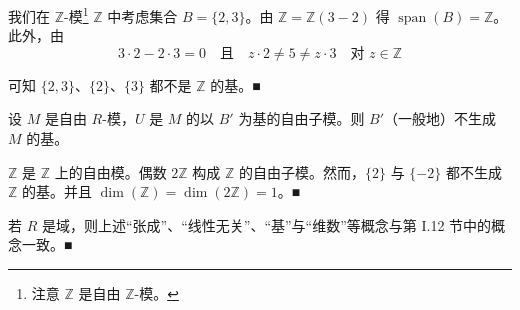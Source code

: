\begin{remark}
\begin{items}
\proofhead
我们在 $ \mathbb{Z} $-模\footnote{注意 $ \mathbb{Z} $ 是自由 $ \mathbb{Z} $-模。} $ \mathbb{Z} $ 中考虑集合 $ B = \{2,3\} $。由 $ \mathbb{Z} = \mathbb{Z}(3-2) $ 得 $ \operatorname{span}(B) = \mathbb{Z} $。此外，由
\[
3\cdot 2 - 2\cdot 3 = 0 \quad \text{且} \quad z\cdot 2 \ne 5 \ne z\cdot 3 \quad \text{对 } z \in \mathbb{Z}
\]

可知 $ \{2,3\} $、$ \{2\} $、$ \{3\} $ 都不是 $ \mathbb{Z} $ 的基。\nobreak\hspace{0.35em}■

\item

设 $ M $ 是自由 $ R $-模，$ U $ 是 $ M $ 的以 $ B' $ 为基的自由子模。则 $ B' $（一般地）不生成 $ M $ 的基。

\proofhead
$ \mathbb{Z} $ 是 $ \mathbb{Z} $ 上的自由模。偶数 $ 2\mathbb{Z} $ 构成 $ \mathbb{Z} $ 的自由子模。然而，$ \{2\} $ 与 $ \{-2\} $ 都不生成 $ \mathbb{Z} $ 的基。并且 $ \dim(\mathbb{Z}) = \dim(2\mathbb{Z}) = 1 $。\nobreak\hspace{0.35em}■
\item

若 $ R $ 是域，则上述“张成”、“线性无关”、“基”与“维数”等概念与第 I.12 节中的概念一致。\nobreak\hspace{0.35em}■

\end{items}

\end{remark}

\exerciseshead

